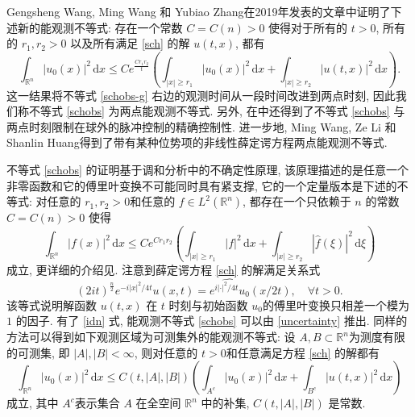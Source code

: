 \documentclass[master]{cugthesis}
\newcommand\R{\ensuremath{\mathbb{R}}}
\renewcommand\d{\ensuremath{\,\mathrm{d}}}
\begin{document}
     Gengsheng Wang, Ming Wang 和 Yubiao Zhang在2019年发表的文章\cite{Wang2019ObservabilityAU}中证明了下述新的能观测不等式: 存在一个常数 $C=C(n)>0$ 使得对于所有的 $t>0$, 所有的 $r_1,r_2>0$ 以及所有满足 \eqref{sch} 的解 $u(t,x)$, 都有
    \begin{equation}
        \int_{\R^n}|u_0(x)|^2\d x\le C e^{\frac{Cr_1r_2}{t}}\left(\int_{|x|\ge r_1}|u_0(x)|^2\d x+\int_{|x|\ge r_2}|u(t,x)|^2\d x\right).\label{schobs}
    \end{equation}这一结果将不等式 \eqref{schobs-g} 右边的观测时间从一段时间改进到两点时刻,    因此我们称不等式 \eqref{schobs} 为两点能观测不等式. 另外, 在\cite[5.2节]{Wang2019ObservabilityAU}中还得到了不等式 \eqref{schobs} 与两点时刻限制在球外的脉冲控制的精确控制性. 进一步地, Ming Wang, Ze Li 和 Shanlin Huang\cite{Wang2021Indiana}得到了带有某种位势项的非线性薛定谔方程两点能观测不等式.
    
    不等式 \eqref{schobs} 的证明基于调和分析中的不确定性原理, 该原理描述的是任意一个非零函数和它的傅里叶变换不可能同时具有紧支撑, 它的一个定量版本是下述的不等式: 对任意的 $r_1,r_2>0$和任意的 $f\in L^2(\R^n)$, 都存在一个只依赖于 $n$ 的常数 $C=C(n)>0$ 使得
    \begin{equation}
        \int_{\R^n}|f(x)|^2\d x\le C e^{Cr_1r_2}\left(\int_{|x|\ge r_1}|f|^2\d x+\int_{|x|\ge r_2}|\widehat{f}(\xi)|^2\d \xi\right)\label{uncertainty}
    \end{equation}
    成立, 更详细的介绍见\cite{Havin2012, Jaming2007NazarovsUP,Nazarov1993}. 注意到薛定谔方程 \eqref{sch} 的解满足关系式\cite{Linares2014Ponce}
    \begin{equation}
        (2it)^{\frac{n}{2}}e^{-i|x|^2 / 4t} u(x,t) = \widehat{e^{i|\cdot|^2 /4t}u_0}(x /2t), \quad\forall t>0.\label{idn}
    \end{equation}
    该等式说明解函数 $u(t,x)$ 在 $t$ 时刻与初始函数 $u_0$的傅里叶变换只相差一个模为 $1$ 的因子. 有了 \eqref{idn} 式, 能观测不等式 \eqref{schobs} 可以由 \eqref{uncertainty} 推出. 同样的方法可以得到如下观测区域为可测集外的能观测不等式: 设 $A,B\subset \R^n$为测度有限的可测集, 即 $|A|,|B|<\infty$, 则对任意的 $t>0$和任意满足方程 \eqref{sch} 的解都有
    \begin{equation}
        \int_{\R^n}|u_0(x)|^2\d x\le C(t,|A|,|B|)\left(\int_{A^c}|u_0(x)|^2\d x+\int_{B^c}|u(t,x)|^2\d x\right)\label{schobs-2}
    \end{equation}
    成立, 其中 $A^c$表示集合 $A$ 在全空间 $\R^n$ 中的补集, $C(t,|A|,|B|)$ 是常数.
    
\end{document}
